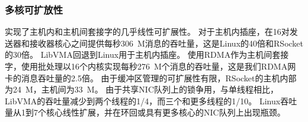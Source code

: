 \subsubsection{多核可扩放性}





\sys 实现了主机内和主机间套接字的几乎线性可扩展性。
对于主机内插座，\sys 在16对发送器和接收器核心之间提供每秒306~M消息的吞吐量，这是Linux的40倍和RSocket的30倍。
LibVMA回退到Linux用于主机内插座。
使用RDMA作为主机间套接字，\sys 使用批处理以16个内核实现每秒276~M个消息的吞吐量，这是我们RDMA网卡的消息吞吐量的2.5倍。
由于缓冲区管理的可扩展性有限，RSocket的主机内部为24~M，主机间为33~M。
由于共享NIC队列上的锁争用，与单线程相比，LibVMA的吞吐量减少到两个线程的1/4，而三个和更多线程的1/10。
Linux吞吐量从1到7个核心线性扩展，并在环回或具有更多核心的NIC队列上出现瓶颈。



